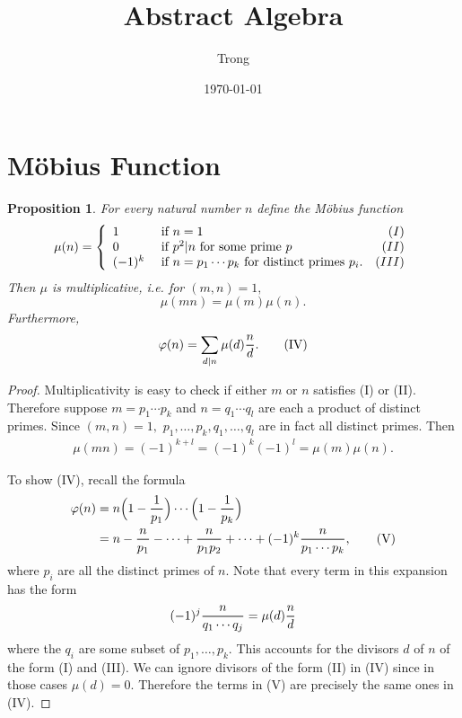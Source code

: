 \documentclass[12pt]{article}
\title{Abstract Algebra}
\author{Trong}
\date{\today}
\theoremstyle{plain}
\newtheorem{proposition}[theorem]{Proposition}
\theoremstyle{definition}
\theoremstyle{remark}
\renewcommand\frac[2]{\genfrac{}{}{0.6pt}{}{#1}{#2}}
\newcommand{\0}{\varnothing}
\newcommand{\f}{\varphi}
\newcommand{\m}{\mu}
\newcommand{\<}{\langle}
\renewcommand{\>}{\rangle}
\begin{document}
\sloppy
\maketitle

\tableofcontents

\section{M\"obius Function}

\begin{proposition}
For every natural number $ n $ define the M\"obius function
\[
\m(n) = \left\{
\begin{array}{llr}
1 & \text{ if $ n = 1 $} & (I) \\
0 & \text{ if $ p^2 | n $ for some prime $ p $} & (II) \\
(-1)^k & \text{ if $ n = p_1 \cdots p_k $ for distinct primes $ p_i. $} & (III)
\end{array}
\right.
\]
Then $ \m $ is multiplicative, i.e. for $ (m, n) = 1, $ \[
\m(mn) = \m(m) \m(n).
\]
Furthermore, \[
\f(n) = \sum_{d|n} \m(d) \frac{n}{d}. \tag{IV}
\]
\end{proposition}

\begin{proof}
Multiplicativity is easy to check if either $ m $ or $ n $ satisfies (I) or (II). Therefore suppose $ m = p_1 \cdots p_k $ and $ n = q_1 \cdots q_l $ are each a product of distinct primes. Since $ (m, n) = 1, $ $ p_1, \ldots, p_k, q_1, \ldots, q_l $ are in fact all distinct primes. Then \begin{align*}
\m(mn) = (-1)^{k+l} = (-1)^{k} (-1)^{l} = \m(m)\m(n).
\end{align*}

To show (IV), recall the formula
\begin{align*}
\f(n) &= n \Big(1 - \frac{1}{p_1}\Big) \cdots \Big(1 - \frac{1}{p_k}\Big) \\
&= n - \frac{n}{p_1} - \cdots + \frac{n}{p_1 p_2} + \cdots + (-1)^{k} \frac{n}{p_1\cdots p_k}, \tag{V}
\end{align*}
where $ p_i $ are all the distinct primes of $ n. $ Note that every term in this expansion has the form \[
  (-1)^{j} \frac{n}{q_1 \cdots q_j} = \m(d) \frac{n}{d}
\]
where the $ q_i $ are some subset of $ p_1,\ldots,p_k. $ This accounts for the divisors $ d $ of $ n $ of the form (I) and (III). We can ignore divisors of the form (II) in (IV) since in those cases $ \m(d) = 0. $ Therefore the terms in (V) are precisely the same ones in (IV).
\end{proof}
\end{document}
